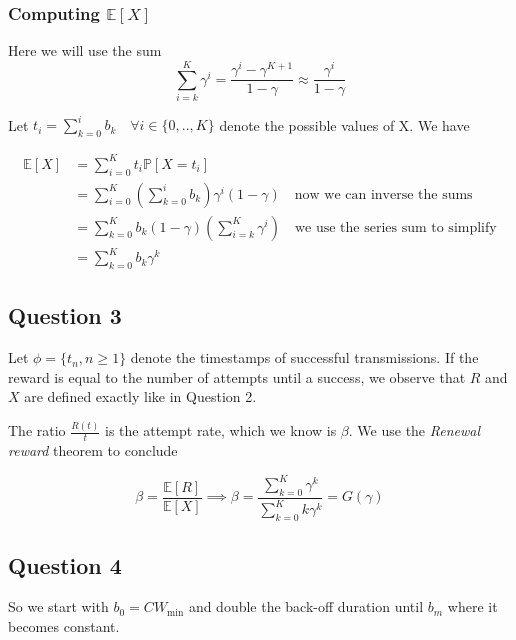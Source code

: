 \documentclass[]{article}
\begin{document}
	\subsubsection*{Computing $\mathbb{E}[X]$}
	
	\begin{tcolorbox}
		Here we will use the sum
		\begin{equation}
			\sum_{i=k}^{K} \gamma^i = \frac{\gamma^i - \gamma^{K+1}}{1 - \gamma} \approx \frac{\gamma^i }{1 - \gamma}
		\end{equation}
	\end{tcolorbox}
	
	Let $t_i = \sum_{k=0}^{i} b_k \quad \forall i \in \{0,..,K\}$ denote the possible values of X. We have
	
	\begin{align}
		\mathbb{E}[X] &= \sum_{i=0}^{K} t_i \mathbb{P}[X = t_i] \\
		&= \sum_{i=0}^{K} \left(\sum_{k=0}^{i} b_k\right) \gamma^i(1-\gamma) \quad \text{now we can inverse the sums} \\
		&= \sum_{k=0}^{K} b_k (1 - \gamma) \left(\sum_{i=k}^{K} \gamma^i\right) \quad \text{we use the series sum to simplify} \\
		&= \sum_{k=0}^{K} b_k \gamma^k
	\end{align}
	
	\subsection*{Question 3}
	
	Let $\phi = \{t_n, n \geq 1\}$ denote the timestamps of successful transmissions. If the reward is equal to the number of attempts until a success, we observe that $R$ and $X$ are defined exactly like in Question 2.
	
	The ratio $\frac{R(t)}{t}$ is the attempt rate, which we know is $\beta$. We use the \textit{Renewal reward} theorem to conclude
	
	\begin{equation}
		\beta = \frac{\mathbb{E}[R]}{\mathbb{E}[X]} \implies \beta = \frac{\sum_{k=0}^{K} \gamma^k}{\sum_{k=0}^{K} k \gamma^k} = G(\gamma)
	\end{equation}
	
	\subsection*{Question 4}
	
	So we start with $b_0 = CW_{\text{min}}$ and double the back-off duration until $b_m$ where it becomes constant.
	
\end{document}
